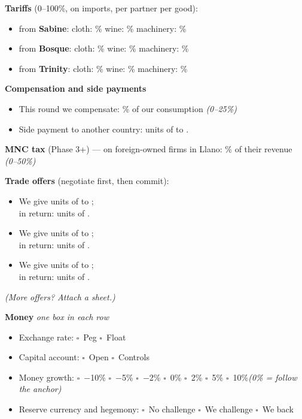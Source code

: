 \documentclass[11pt]{article}
\newcommand{\blank}[1]{\underline{\hspace{#1}}}
\newcommand{\boxx}{$\square$}
\begin{document}
{\bfseries Tariffs} (0--100\%, on imports, per partner per good):\par
\begin{itemize}[nosep,leftmargin=1.4em]
  \item from \textbf{Sabine}: \quad cloth: \blank{1.4cm}\% \quad wine: \blank{1.4cm}\% \quad machinery: \blank{1.4cm}\%
  \item from \textbf{Bosque}: \quad cloth: \blank{1.4cm}\% \quad wine: \blank{1.4cm}\% \quad machinery: \blank{1.4cm}\%
  \item from \textbf{Trinity}: \quad cloth: \blank{1.4cm}\% \quad wine: \blank{1.4cm}\% \quad machinery: \blank{1.4cm}\%
\end{itemize}

{\bfseries Compensation and side payments}\par
\begin{itemize}[nosep,leftmargin=1.4em]
  \item This round we compensate: \blank{1.4cm}\% of our consumption \quad \textit{(0--25\%)}
  \item Side payment to another country: \blank{1.6cm} units of \blank{2cm} to \blank{2.2cm}.
\end{itemize}

{\bfseries MNC tax} (Phase 3+) --- on foreign-owned firms in Llano: \blank{1.4cm}\% of their revenue \quad \textit{(0--50\%)}\par

{\bfseries Trade offers} (negotiate first, then commit):\par
\begin{itemize}[itemsep=4pt,leftmargin=1.4em]
  \item We give \blank{1.8cm} units of \blank{2.2cm} to \blank{2.2cm};\\[2pt] in return: \blank{1.8cm} units of \blank{2.2cm}.
  \item We give \blank{1.8cm} units of \blank{2.2cm} to \blank{2.2cm};\\[2pt] in return: \blank{1.8cm} units of \blank{2.2cm}.
  \item We give \blank{1.8cm} units of \blank{2.2cm} to \blank{2.2cm};\\[2pt] in return: \blank{1.8cm} units of \blank{2.2cm}.
\end{itemize}
\textit{(More offers? Attach a sheet.)}

{\bfseries Money} \hfill \textit{one box in each row}\par
\begin{itemize}[nosep,leftmargin=1.4em]
  \item Exchange rate: \quad \boxx\ Peg \quad \boxx\ Float
  \item Capital account: \quad \boxx\ Open \quad \boxx\ Controls
  \item Money growth: \quad \boxx\ $-$10\% \quad \boxx\ $-$5\% \quad \boxx\ $-$2\% \quad \boxx\ 0\% \quad \boxx\ 2\% \quad \boxx\ 5\% \quad \boxx\ 10\%\newline \textit{(0\% = follow the anchor)}
  \item Reserve currency and hegemony: \quad \boxx\ No challenge \quad \boxx\ We challenge \quad \boxx\ We back \blank{2.2cm}
\end{itemize}
\end{document}
